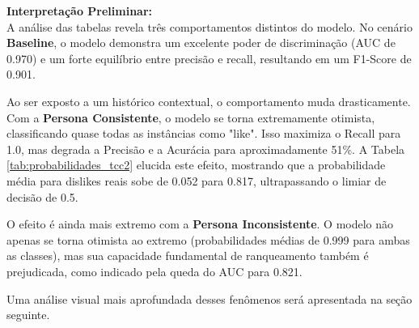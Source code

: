 \textbf{Interpretação Preliminar:} \\
A análise das tabelas revela três comportamentos distintos do modelo. No cenário \textbf{Baseline}, o modelo demonstra um excelente poder de discriminação (AUC de 0.970) e um forte equilíbrio entre precisão e recall, resultando em um F1-Score de 0.901.

Ao ser exposto a um histórico contextual, o comportamento muda drasticamente. Com a \textbf{Persona Consistente}, o modelo se torna extremamente otimista, classificando quase todas as instâncias como "like". Isso maximiza o Recall para 1.0, mas degrada a Precisão e a Acurácia para aproximadamente 51\%. A Tabela \ref{tab:probabilidades_tcc2} elucida este efeito, mostrando que a probabilidade média para dislikes reais sobe de 0.052 para 0.817, ultrapassando o limiar de decisão de 0.5.

O efeito é ainda mais extremo com a \textbf{Persona Inconsistente}. O modelo não apenas se torna otimista ao extremo (probabilidades médias de 0.999 para ambas as classes), mas sua capacidade fundamental de ranqueamento também é prejudicada, como indicado pela queda do AUC para 0.821.

Uma análise visual mais aprofundada desses fenômenos será apresentada na seção seguinte.